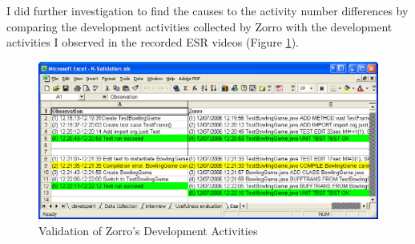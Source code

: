 I did further investigation to find the causes to the activity number 
differences by comparing the development activities collected by Zorro 
with the development activities I observed in the recorded ESR videos
(Figure \ref{fig:ZorroDataValidation}). 
\begin{figure}[!h]
  \centering
  \includegraphics[width=1.0\textwidth]{figs/ZorroSensorDataValidation.eps}
  \caption{Validation of Zorro's Development Activities}
  \label{fig:ZorroDataValidation}
\end{figure}

